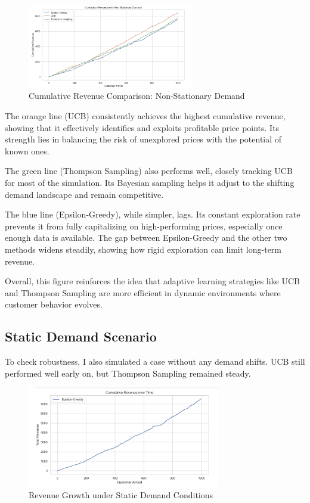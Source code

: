 \documentclass[12pt]{article}
\begin{document}
\begin{figure}[h!]
  \centering
  \includegraphics[width=0.65\textwidth]{cumulative revenue with non stationary demand.png}
  \caption{Cumulative Revenue Comparison: Non-Stationary Demand}
  \label{fig:nonstationary-revenue}
\end{figure}

The orange line (UCB) consistently achieves the highest cumulative revenue, showing that it effectively identifies and exploits profitable price points. Its strength lies in balancing the risk of unexplored prices with the potential of known ones. 

The green line (Thompson Sampling) also performs well, closely tracking UCB for most of the simulation. Its Bayesian sampling helps it adjust to the shifting demand landscape and remain competitive.

The blue line (Epsilon-Greedy), while simpler, lags. Its constant exploration rate prevents it from fully capitalizing on high-performing prices, especially once enough data is available. The gap between Epsilon-Greedy and the other two methods widens steadily, showing how rigid exploration can limit long-term revenue.

Overall, this figure reinforces the idea that adaptive learning strategies like UCB and Thompson Sampling are more efficient in dynamic environments where customer behavior evolves.

\subsection*{Static Demand Scenario}
To check robustness, I also simulated a case without any demand shifts. UCB still performed well early on, but Thompson Sampling remained steady.

\begin{figure}[h!]
  \centering
  \includegraphics[width=0.75\textwidth]{cumulative revenue over time.png}
  \caption{Revenue Growth under Static Demand Conditions}
  \label{fig:static-revenue}
\end{figure}
\end{document}
